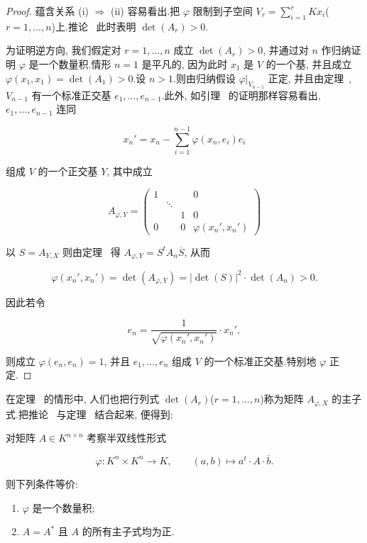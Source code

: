\begin{proof}
蕴含关系 (i) $\Longrightarrow$ (ii) 容易看出.把 $\varphi$ 限制到子空间 $V_r = \sum_{i = 1}^{r} K x_i$($r = 1, \ldots, n$)上.推论~ 此时表明 $\det(A_r) > 0$.

为证明逆方向, 我们假定对 $r = 1, \ldots, n$ 成立 $\det(A_r) > 0$, 并通过对 $n$ 作归纳证明 $\varphi$ 是一个数量积.情形 $n = 1$ 是平凡的, 因为此时 $x_1$ 是 $V$ 的一个基, 并且成立 $\varphi(x_1, x_1) = \det(A_1) > 0$.设 $n > 1$.则由归纳假设 $\varphi|_{V_{n-1}}$ 正定, 并且由定理~, $V_{n-1}$ 有一个标准正交基 $e_1, \ldots, e_{n-1}$.此外, 如引理~ 的证明那样容易看出, $e_1, \ldots, e_{n-1}$ 连同

\[
x_n' = x_n - \sum_{i = 1}^{n-1} \varphi(x_n, e_i) e_i
\]

组成 $V$ 的一个正交基 $Y$, 其中成立

\[
A_{\varphi, Y} = \begin{pmatrix}
1 & & & 0 \\
& \ddots & & \\
& & 1 & 0 \\
0 & & 0 & \varphi(x_n', x_n')
\end{pmatrix}
\]

以 $S = A_{Y, X}$ 则由定理~ 得 $A_{\varphi, Y} = S^{t} A_n \overline{S}$, 从而

\[
\varphi(x_n', x_n') = \det(A_{\varphi, Y}) = |\det(S)|^2 \cdot \det(A_n) > 0\text{.}
\]

因此若令

\[
e_n = \frac{1}{\sqrt{\varphi(x_n', x_n')}} \cdot x_n',
\]

则成立 $\varphi(e_n, e_n) = 1$, 并且 $e_1, \ldots, e_n$ 组成 $V$ 的一个标准正交基.特别地 $\varphi$ 正定.
\end{proof}

在定理~ 的情形中, 人们也把行列式 $\det(A_r)$($r = 1, \ldots, n$)称为矩阵 $A_{\varphi, X}$ 的主子式.把推论~ 与定理~ 结合起来, 便得到:

\begin{corollary}\label{cor:7.3.9}
对矩阵 $A \in K^{n \times n}$ 考察半双线性形式

\[
\varphi \colon K^n \times K^n \longrightarrow K, \qquad (a, b) \longmapsto a^{t} \cdot A \cdot \overline{b}\text{.}
\]

则下列条件等价:
\begin{enumerate}
\item[(i)] $\varphi$ 是一个数量积;
\item[(ii)] $A = A^{*}$ 且 $A$ 的所有主子式均为正.
\end{enumerate}
\end{corollary}

